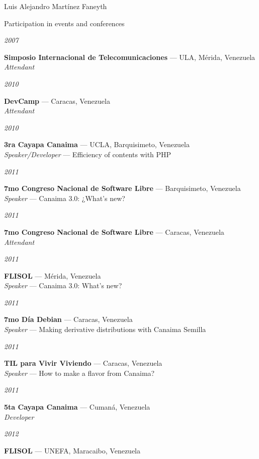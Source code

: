 \documentclass[11pt,letterpaper]{article}
\begin{document}
\begin{cv}{Luis Alejandro Mart\'inez Faneyth}
\begin{cvlist}{Participation in events and conferences}
\item[{\parbox[t]{6em}{\textit{\large{2007}}}}]{
	\parbox[t]{\linewidth}{
		\textbf{Simposio Internacional de Telecomunicaciones} --- ULA, M\'erida, Venezuela\\
		\textit{Attendant}
	}
}
\item[{\parbox[t]{6em}{\textit{\large{2010}}}}]{
	\parbox[t]{\linewidth}{
		\textbf{DevCamp} --- Caracas, Venezuela\\
		\textit{Attendant}
	}
}
\item[{\parbox[t]{6em}{\textit{\large{2010}}}}]{
	\parbox[t]{\linewidth}{
		\textbf{3ra Cayapa Canaima} --- UCLA, Barquisimeto, Venezuela\\
		\textit{Speaker/Developer} --- Efficiency of contents with PHP
	}
}
\item[{\parbox[t]{6em}{\textit{\large{2011}}}}]{
	\parbox[t]{\linewidth}{
		\textbf{7mo Congreso Nacional de Software Libre} --- Barquisimeto, Venezuela\\
		\textit{Speaker} --- Canaima 3.0: ¿What's new?
	}
}
\item[{\parbox[t]{6em}{\textit{\large{2011}}}}]{
	\parbox[t]{\linewidth}{
		\textbf{7mo Congreso Nacional de Software Libre} --- Caracas, Venezuela\\
		\textit{Attendant}
	}
}
\item[{\parbox[t]{6em}{\textit{\large{2011}}}}]{
	\parbox[t]{\linewidth}{
		\textbf{FLISOL} --- M\'erida, Venezuela\\
		\textit{Speaker} --- Canaima 3.0: What's new?
	}
}
\item[{\parbox[t]{6em}{\textit{\large{2011}}}}]{
	\parbox[t]{\linewidth}{
		\textbf{7mo D\'ia Debian} --- Caracas, Venezuela\\
		\textit{Speaker} --- Making derivative distributions with Canaima Semilla
	}
}
\item[{\parbox[t]{6em}{\textit{\large{2011}}}}]{
	\parbox[t]{\linewidth}{
		\textbf{TIL para Vivir Viviendo} --- Caracas, Venezuela\\
		\textit{Speaker} --- How to make a flavor from Canaima?
	}
}
\item[{\parbox[t]{6em}{\textit{\large{2011}}}}]{
	\parbox[t]{\linewidth}{
		\textbf{5ta Cayapa Canaima} --- Cuman\'a, Venezuela\\
		\textit{Developer}
	}
}
\item[{\parbox[t]{6em}{\textit{\large{2012}}}}]{
	\parbox[t]{\linewidth}{
		\textbf{FLISOL} --- UNEFA, Maracaibo, Venezuela\\
}}
\end{cvlist}
\end{cv}
\end{document}
